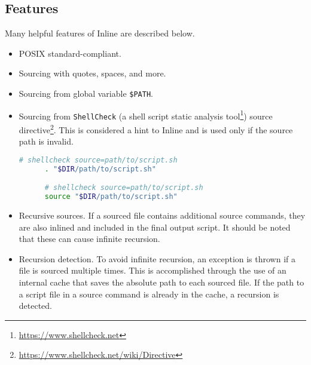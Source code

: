 \subsection{Features}
\label{subsec:projects_inline_features}

Many helpful features of Inline are described below.

\begin{itemize}
  \item POSIX standard-compliant.

  \item Sourcing with quotes, spaces, and more.

  \item Sourcing from global variable \texttt{\$PATH}.

  \item Sourcing from \texttt{ShellCheck} (a shell script static analysis tool\footnote{\url{https://www.shellcheck.net}})
    source directive\footnote{\url{https://www.shellcheck.net/wiki/Directive}}.
    \newline
    This is considered a hint to Inline and is used only if the source path is invalid.
    \newline
    \begin{lstlisting}[language=sh, morekeywords={., source}, numbers=none, aboveskip=0pt, belowskip=0pt, abovecaptionskip=0pt, belowcaptionskip=0pt]
      # shellcheck source=path/to/script.sh
      . "$DIR/path/to/script.sh"

      # shellcheck source=path/to/script.sh
      source "$DIR/path/to/script.sh"
    \end{lstlisting}

  \item Recursive sources. If a sourced file contains additional source commands,
    they are also inlined and included in the final output script.
    \newline
    It should be noted that these can cause infinite recursion.

  \item Recursion detection. To avoid infinite recursion, an exception is thrown
    if a file is sourced multiple times. This is accomplished through the use of
    an internal cache that saves the absolute path to each sourced file. If the path
    to a script file in a source command is already in the cache, a recursion is
    detected.


\end{itemize}

